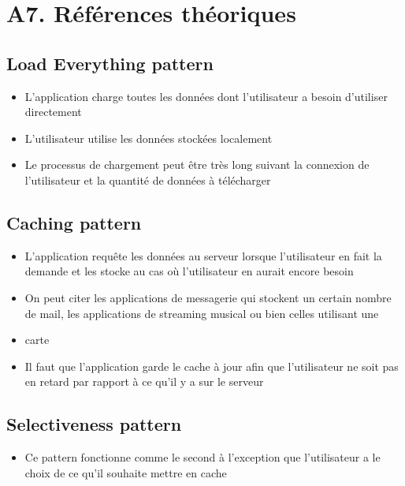 \section{A7. Références théoriques}

	\subsection{Load Everything pattern}
		\begin{itemize}
			\item L’application charge toutes les données dont l’utilisateur a besoin d’utiliser directement
			\item L’utilisateur utilise les données stockées localement
			\item Le processus de chargement peut être très long suivant la connexion de l’utilisateur et la quantité de données à télécharger
		\end{itemize}

	\subsection{Caching pattern}
		\begin{itemize}
			\item L’application requête les données au serveur lorsque l’utilisateur en fait la demande et les stocke au cas où l’utilisateur en aurait encore besoin
			\item On peut citer les applications de messagerie qui stockent un certain nombre de mail, les applications de streaming musical ou bien celles utilisant une 			\item carte
			\item Il faut que l’application garde le cache à jour afin que l’utilisateur ne soit pas en retard par rapport à ce qu’il y a sur le serveur
		\end{itemize}

	\subsection{Selectiveness pattern}
		\begin{itemize}
			\item Ce pattern fonctionne comme le second à l’exception que l’utilisateur a le choix de ce qu’il souhaite mettre en cache
		\end{itemize}